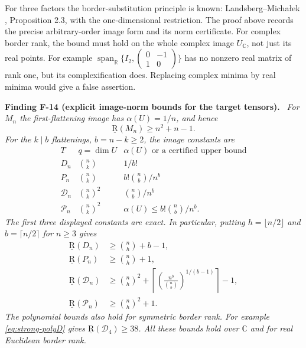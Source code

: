 \documentclass[11pt]{article}
\newcommand{\R}{\mathbb R}\newcommand{\C}{\mathbb C}
\newcommand{\BR}{\underline{\mathrm R}}\newcommand{\TR}{\mathrm R}
\newcommand{\Span}{\operatorname{span}}\newcommand{\Gr}{\operatorname{Gr}}
\newcommand{\ceil}[1]{\left\lceil#1\right\rceil}
\newenvironment{finding}[2]{\par\medskip\noindent\textbf{Finding #1 (#2).}\ \itshape}{\par\medskip}
\begin{document}
For three factors the border-substitution principle is known:
Landsberg--Micha{\l}ek \cite{LM}, Proposition 2.3, with the
one-dimensional restriction. The proof above records the precise
arbitrary-order image form and its norm certificate.
For complex border rank, the bound must hold on the whole complex
image $U_\C$, not just its real points. For example
$\Span_\R\{I_2,\left(\begin{smallmatrix}0&-1\\1&0\end{smallmatrix}\right)\}$
has no nonzero real matrix of rank one, but its complexification does.
Replacing complex minima by real minima would give a false assertion.

\begin{finding}{F-14}{explicit image-norm bounds for the target tensors}
For $M_n$ the first-flattening image has $\alpha(U)=1/n$, and hence
\begin{equation}\label{eq:strong-MM}
 \BR(M_n)\geq n^2+n-1.
\end{equation}
For the $k\mid b$ flattenings, $b=n-k\geq2$, the image constants are
\[
\begin{array}{c|c|c}
T& q=\dim U&\alpha(U)\text{ or a certified upper bound}\\ \hline
D_n&\binom nk&1/b!\\
P_n&\binom nk&b!\binom nb/n^b\\
\mathcal D_n&\binom nk^2&\binom nb/n^b\\
\mathcal P_n&\binom nk^2&\alpha(U)\leq b!\binom nb/n^b .
\end{array}
\]
The first three displayed constants are exact. In particular, putting
$h=\lfloor n/2\rfloor$ and $b=\lceil n/2\rceil$ for $n\geq3$ gives
\begin{align}
 \BR(D_n)&\geq\binom nh+b-1,\label{eq:strong-D}\\
 \BR(P_n)&\geq\binom nh+1,\label{eq:strong-P}\\
 \BR(\mathcal D_n)&\geq
  \binom nh^2+\ceil{\left(\frac{n^b}{\binom nb}\right)^{1/(b-1)}}-1,
        \label{eq:strong-polyD}\\
 \BR(\mathcal P_n)&\geq\binom nh^2+1.\label{eq:strong-polyP}
\end{align}
The polynomial bounds also hold for symmetric border rank.
For example \eqref{eq:strong-polyD} gives
$\BR(\mathcal D_4)\geq38$. All these bounds hold over $\C$ and
for real Euclidean border rank.
\end{finding}
\end{document}
